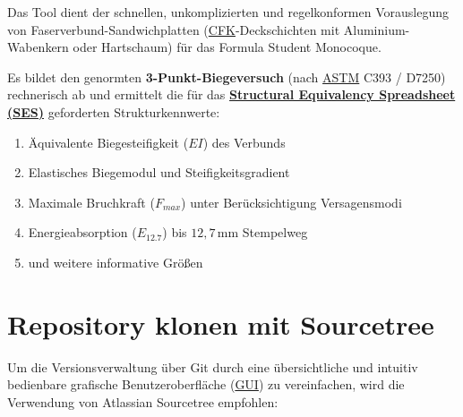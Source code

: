 Das Tool dient der schnellen, unkomplizierten und regelkonformen Vorauslegung von Faserverbund-Sandwichplatten (\hyperref[abk:CFK]{CFK}-Deckschichten mit Aluminium-Wabenkern oder Hartschaum) für das Formula Student Monocoque.

Es bildet den genormten \textbf{3-Punkt-Biegeversuch} (nach \hyperref[abk:ASTM]{ASTM} C393 / D7250) rechnerisch ab und ermittelt die für das \hyperref[abk:SES]{\textbf{Structural Equivalency Spreadsheet (SES)}} geforderten Strukturkennwerte:
\begin{enumerate}
    \item Äquivalente Biegesteifigkeit (\hyperref[abk:EI]{$EI$}) des Verbunds
    \item Elastisches Biegemodul und Steifigkeitsgradient
    \item Maximale Bruchkraft ($F_{max}$) unter Berücksichtigung Versagensmodi
    \item Energieabsorption ($E_{12.7}$) bis $12{,}7\,\text{mm}$ Stempelweg
    \item und weitere informative Größen
\end{enumerate}










\section{Repository klonen mit Sourcetree} \label{sec:sourcetree}

Um die Versionsverwaltung über Git durch eine übersichtliche und intuitiv bedienbare grafische Benutzeroberfläche (\hyperref[abk:GUI]{GUI}) zu vereinfachen, wird die Verwendung von Atlassian Sourcetree empfohlen:

